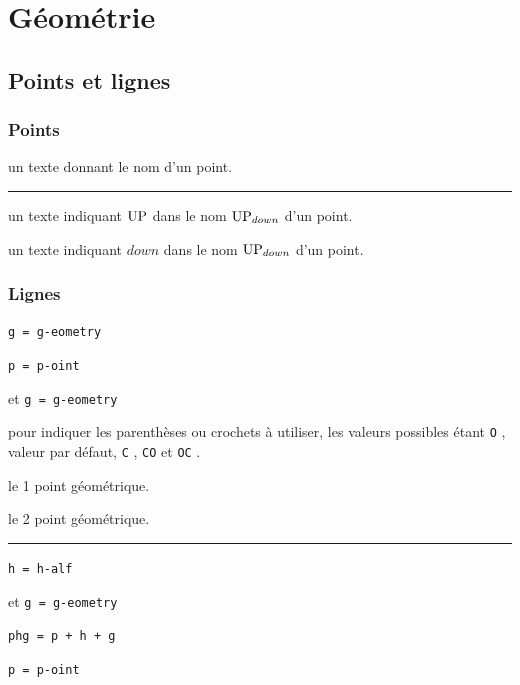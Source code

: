 \documentclass[12pt,a4paper]{book}
\theoremstyle{definition}
\newcommand\separation{
	\medskip
	\hfill\rule{0.5\textwidth}{0.75pt}\hfill
	\medskip
}
\newcommand\extraspace{
	\vspace{0.25em}
}
\newcommand\mwhyprefix[2]{%
	\texttt{#1 = #1-#2}%
}
\newcommand\prefix[1]{%
	\texttt{#1}%
}
\begin{document}
{{\section{Géométrie}

\subsection{Points et lignes}

\subsubsection{Points}




\IDarg{} un texte donnant le nom d'un point.


\separation



 un texte indiquant $\pt{UP}$ dans le nom $\pt*{UP}{down}$ d'un point.

 un texte indiquant $down$ dans le nom $\pt*{UP}{down}$ d'un point.




\subsubsection{Lignes}



   \hfill \mwhyprefix{g}{eometry}

  \hfill \mwhyprefix{p}{oint}
                              et \mwhyprefix{g}{eometry}

\IDoption{} pour indiquer les parenthèses ou crochets à utiliser, les valeurs possibles étant \prefix{O}, valeur par défaut, \prefix{C}, \prefix{CO} et \prefix{OC}.

 le 1\ier{} point géométrique.

 le 2\ieme{} point géométrique.


\separation


   \hfill \mwhyprefix{h}{alf}
                             et \mwhyprefix{g}{eometry}

  \hfill \prefix{phg = p + h + g}

\extraspace


  \hfill \mwhyprefix{p}{oint}

}}
\end{document}
